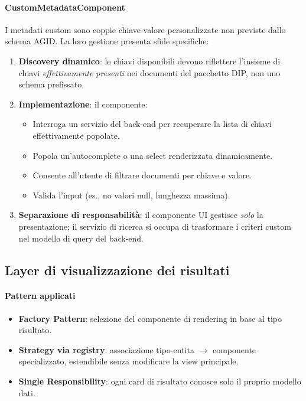 \paragraph{CustomMetadataComponent}
I metadati custom sono coppie chiave-valore personalizzate non previste dallo schema AGID. La loro gestione presenta sfide specifiche:

\begin{enumerate}
    \item \textbf{Discovery dinamico}: le chiavi disponibili devono riflettere l'insieme di chiavi \textit{effettivamente presenti} nei documenti del pacchetto DIP, non uno schema prefissato.
    
    \item \textbf{Implementazione}: il componente:
    \begin{itemize}
        \item Interroga un servizio del back-end per recuperare la lista di chiavi effettivamente popolate.
        \item Popola un'autocomplete o una select renderizzata dinamicamente.
        \item Consente all'utente di filtrare documenti per chiave e valore.
        \item Valida l'input (es., no valori null, lunghezza massima).
    \end{itemize}
    
    \item \textbf{Separazione di responsabilità}: il componente UI gestisce \textit{solo} la presentazione; il servizio di ricerca si occupa di trasformare i criteri custom nel modello di query del back-end.
\end{enumerate}


\subsection{Layer di visualizzazione dei risultati}

\paragraph{Pattern applicati}
\begin{itemize}
    \item \textbf{Factory Pattern}: selezione del componente di rendering in base al tipo risultato.
    \item \textbf{Strategy via registry}: associazione tipo-entita $\rightarrow$ componente specializzato, estendibile senza modificare la view principale.
    \item \textbf{Single Responsibility}: ogni card di risultato conosce solo il proprio modello dati.
\end{itemize}

